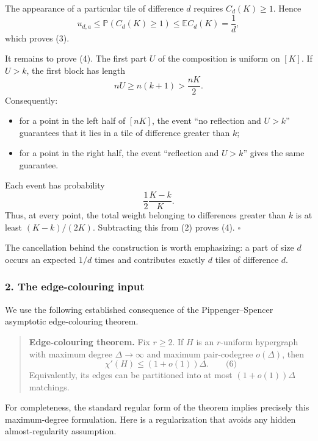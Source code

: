 \documentclass[
  11pt,
  a4paper,
]{article}
\providecommand{\tightlist}{%
  \setlength{\itemsep}{0pt}\setlength{\parskip}{0pt}}
\begin{document}
The appearance of a particular tile of difference \(d\) requires
\(C_d(K)\ge1\). Hence \[
u_{d,a}\le\mathbb P(C_d(K)\ge1)
\le\mathbb E C_d(K)=\frac1d,
\] which proves (3).

It remains to prove (4). The first part \(U\) of the composition is
uniform on \([K]\). If \(U>k\), the first block has length \[
nU\ge n(k+1)>\frac{nK}{2}.
\] Consequently:

\begin{itemize}
\tightlist
\item
  for a point in the left half of \([nK]\), the event ``no reflection
  and \(U>k\)'' guarantees that it lies in a tile of difference greater
  than \(k\);
\item
  for a point in the right half, the event ``reflection and \(U>k\)''
  gives the same guarantee.
\end{itemize}

Each event has probability \[
\frac12\frac{K-k}{K}.
\] Thus, at every point, the total weight belonging to differences
greater than \(k\) is at least \((K-k)/(2K)\). Subtracting this from (2)
proves (4). \(\square\)

The cancellation behind the construction is worth emphasizing: a part of
size \(d\) occurs an expected \(1/d\) times and contributes exactly
\(d\) tiles of difference \(d\).

\subsubsection{2. The edge-colouring
input}\label{the-edge-colouring-input}

We use the following established consequence of the Pippenger--Spencer
asymptotic edge-colouring theorem.

\begin{quote}
\textbf{Edge-colouring theorem.} Fix \(r\ge2\). If \(H\) is an
\(r\)-uniform hypergraph with maximum degree \(\Delta\to\infty\) and
maximum pair-codegree \(o(\Delta)\), then \[
\chi'(H)\le(1+o(1))\Delta.
\qquad\text{(6)}
\] Equivalently, its edges can be partitioned into at most
\((1+o(1))\Delta\) matchings.
\end{quote}

For completeness, the standard regular form of the theorem implies
precisely this maximum-degree formulation. Here is a regularization that
avoids any hidden almost-regularity assumption.
\end{document}
